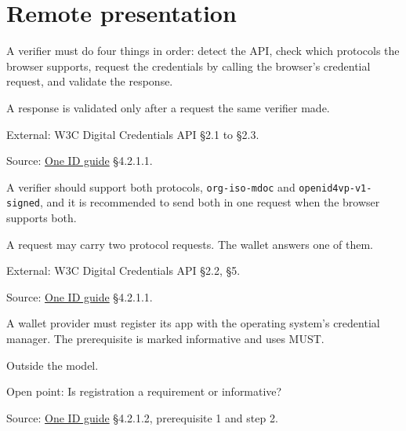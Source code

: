 
\section{Remote presentation}

\begin{definition}
  \label{def:c45}
  A verifier must do four things in order: detect the API, check which
  protocols the browser supports, request the credentials by calling the
  browser's credential request, and validate the response.

  A response is validated only after a request the same verifier made.

  External: W3C Digital Credentials API §2.1 to §2.3.

  Source:
  \href{https://standards.atlassian.net/wiki/spaces/OneID/pages/2947416082/Technical+Implementation+Guide}{One
  ID guide} §4.2.1.1.
\end{definition}

\begin{definition}
  \label{def:c46}
  A verifier should support both protocols, \texttt{org-iso-mdoc} and
  \texttt{openid4vp-v1-signed}, and it is recommended to send both in one
  request when the browser supports both.

  A request may carry two protocol requests. The wallet answers one of them.

  External: W3C Digital Credentials API §2.2, §5.

  Source:
  \href{https://standards.atlassian.net/wiki/spaces/OneID/pages/2947416082/Technical+Implementation+Guide}{One
  ID guide} §4.2.1.1.
\end{definition}

\begin{definition}
  \label{def:c48}
  \notready
  A wallet provider must register its app with the operating system's
  credential manager. The prerequisite is marked informative and uses MUST.

  Outside the model.

  Open point: Is registration a requirement or informative?

  Source:
  \href{https://standards.atlassian.net/wiki/spaces/OneID/pages/2947416082/Technical+Implementation+Guide}{One
  ID guide} §4.2.1.2, prerequisite 1 and step 2.
\end{definition}

